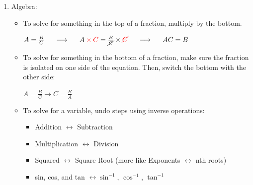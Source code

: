 \documentclass[letterpaper, 12pt]{article}
\begin{document}
\begin{enumerate}
	\vspace{0.25in}
	
	
	\item Algebra:
	\begin{itemize}
		\item To solve for something in the top of a fraction, multiply by the bottom.
		\begin{center}
			$A = \frac {B}{C} \hspace{0.2in} \longrightarrow \hspace{0.2in} A \color{red} \times C \color{black} = \frac {B}{\cancel{C}} \times \color{red} \cancel{C} \hspace{0.2in} \color{black} \longrightarrow  \hspace{0.2in} A C = B	$
		\end{center}
		\item To solve for something in the bottom of a fraction, make sure the fraction is isolated on one side of the equation.  Then, switch the bottom with the other side:
		\begin{center}
			$A = \frac {B}{C} \rightarrow C = \frac {B}{A}	$
		\end{center}
		\item To solve for a variable, undo steps using inverse operations:
			\begin{itemize}
				\item Addition  $ \leftrightarrow$ Subtraction 
				\item Multiplication $\leftrightarrow$ Division
				\item Squared $\leftrightarrow$ Square Root (more like  Exponents $\leftrightarrow$ nth roots)
				\item sin, cos, and tan $\leftrightarrow \sin^{-1}$, $\cos^{-1}$, $\tan^{-1}$
				
				
				

\end{itemize}
\end{itemize}
\end{enumerate}
\end{document}
